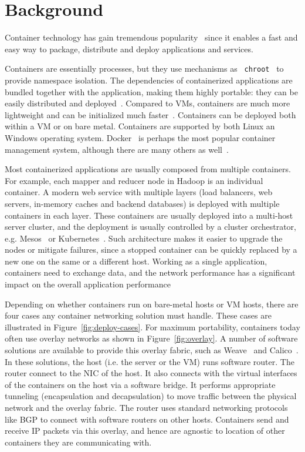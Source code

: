 \section{Background}
\label{sec:background}

Container technology has gain tremendous popularity~\cite{iron-io-300-million,docker-2billion,docker-datadog}
since it enables a fast and easy way to package, distribute and deploy
applications and services.  

Containers are essentially processes, but they use mechanisms as {\tt
chroot}~\cite{chroot} to provide namespace isolation.  The dependencies of
containerized applications are bundled together with the application, making
them highly portable: they can be easily distributed and deployed~\cite{docker}.
Compared to VMs, containers are much more lightweight and can be initialized
much faster~\cite{docker:linjournal,jitsu}. Containers can be deployed both within a VM or
on bare metal. Containers are supported by both Linux an Windows operating
system.  Docker~\cite{docker} is perhaps the most popular container management
system, although there are many others as well~\cite{coreos,kubernetes}.

Most containerized applications are usually composed from multiple containers.
For example, each mapper and reducer node in Hadoop \cite{hadoop} is an
individual container. A modern web service with multiple layers (load balancers,
web servers, in-memory caches and backend databases) is deployed with multiple
containers in each layer.  These containers are usually deployed into a
multi-host server cluster, and the deployment is usually controlled by a cluster
orchestrator, e.g. Mesos~\cite{mesos} or Kubernetes~\cite{kubernetes}.  Such architecture makes it easier to
upgrade the nodes or mitigate failures, since a stopped container can be quickly
replaced by a new one on the same or a different host.  Working as a single
application, containers need to exchange data, and the network performance has a
significant impact on the overall application performance~\cite{varys,orchestra,reining,chowdhury}

Depending on whether containers run on bare-metal hosts or VM hosts, there are
four cases any container networking solution must handle. These cases are
illustrated in Figure~\ref{fig:deploy-cases}.  For maximum portability,
containers today often use overlay networks as shown in Figure~\ref{fig:overlay}.
A number of software solutions are available to provide this overlay fabric,
such as Weave~\cite{weave} and Calico~\cite{calico}. In these solutions, the
host (i.e.  the server or the VM) runs software router. The router connect to
the NIC of the host. It also connects with the virtual interfaces of the
containers on the host via a software bridge. It performs appropriate tunneling
(encapsulation and decapsulation) to move traffic between the physical network
and the overlay fabric. The router uses standard networking protocols like BGP
to connect with software routers on other hosts. Containers send and receive IP
packets via this overlay, and hence are agnostic to location of other containers
they are communicating with.

